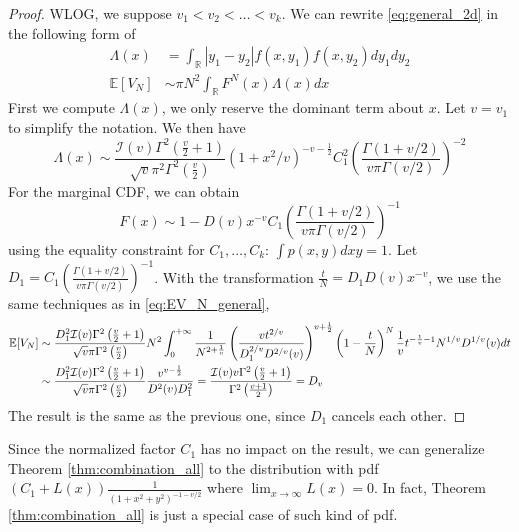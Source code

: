 \documentclass{article}
\def\E{\mathbb{E}}
\def\R{\mathbb{R}}
\begin{document}
\begin{proof}
    WLOG, we suppose $v_1 < v_2 < \dots < v_k$.
    We can rewrite \eqref{eq:general_2d}
    in the following form of
    \begin{align}
        \Lambda(x) &= \int_{\R} |y_1-y_2| f(x, y_1) f(x,y_2)
        dy_1dy_2
        \\
        \E[V_N]
        &\sim \pi N^2 \int_{\R} F^{N}(x) \Lambda(x)dx
    \end{align}
    First we compute $\Lambda(x)$,
    we only reserve the dominant term about $x$.
    Let $v=v_1$ to simplify the notation.
    We then have
    \begin{equation}
        \Lambda(x) \sim \frac{ \mathcal{I}(v)\Gamma^2 \left(\frac{v}{2} +1\right) }
        {\sqrt{v}\pi^2
        \Gamma^2\left(\frac{v}{2}\right)} (1+x^2/v)^{-v-\frac{1}{2}} C^2_1
         \left( \frac{\Gamma(1+v/2)}
         {v\pi \Gamma(v/2)}
         \right)^{-2}
    \end{equation}
    For the marginal CDF, we can obtain
    $$
    F(x) \sim 1 - D(v)x^{-v} C_1
    \left( \frac{\Gamma(1+v/2)}
         {v\pi \Gamma(v/2)}
         \right)^{-1}
    $$
    using
    the equality constraint for
    $C_1, \dots, C_k$:
    $\int p(x,y)dxy=1$.
    Let $D_1 = C_1\left( \frac{\Gamma(1+v/2)}
    {v\pi \Gamma(v/2)}
    \right)^{-1} $.
    With the transformation
    $\frac{t}{N}=D_1D(v)x^{-v}$,
    we use the same techniques
    as in \eqref{eq:EV_N_general},
    \begin{align}
        \E[V_N] &\sim
        \frac{ D_1^2\mathcal{I}(v)
        \Gamma^2 \left(\frac{v}{2} +1\right) }
        {\sqrt{v}\pi
        \Gamma^2\left(\frac{v}{2}\right)}  N^2
        \int_{0}^{+\infty} \frac{1}
        {N^{2+\frac{1}{v}}}
        \left(\frac{v t^{2/v}}{D_1^{2/v}D^{2/v}(v)}\right)^{v+\frac{1}{2}}
        \left(1- \frac{t}{N} \right)^N \frac{1}{v} t^{-\frac{1}{v}-1} N^{1/v} D^{1/v}(v)dt
        \notag \\
        &\sim \frac{ D_1^2\mathcal{I}(v)
        \Gamma^2 \left(\frac{v}{2} +1\right) }
        {\sqrt{v}\pi
        \Gamma^2\left(\frac{v}{2}\right)} \frac{v^{v-\frac{1}{2}}}
        {D^2(v)D_1^2} = \frac{\mathcal{I}(v) v \Gamma^2\left(\frac{v}{2}+1\right)}
        {\Gamma^2 \left(\frac{v+1}{2} \right)} = D_{v}\notag
    \end{align}
    The result is the same as the previous one, since
    $D_1$ cancels each other.
\end{proof}

Since the normalized factor $C_1$ has no impact on the result,
we can generalize Theorem \ref{thm:combination_all}
to the distribution with pdf $(C_1+L(x)) \frac{1}{(1+x^2+y^2)^{-1-v/2}}$
where $\lim_{x\to \infty} L(x) = 0$.
In fact, Theorem \ref{thm:combination_all}
is just a special case of such kind of pdf.
\end{document}
